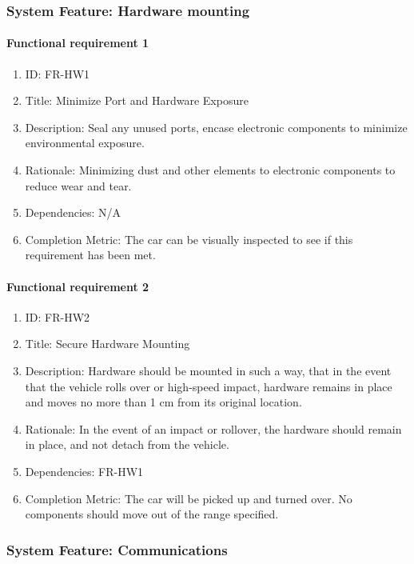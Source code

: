 \documentclass[compsoc,draftclsnofoot,onecolumn,10pt]{IEEEtran}
\begin{document}
\subsubsection{System Feature: Hardware mounting}
	\paragraph{Functional requirement 1}
		\begin{enumerate}
			\item ID: FR-HW1
			\item Title: Minimize Port and Hardware Exposure
			\item Description: Seal any unused ports, encase electronic components to minimize environmental exposure.
			\item Rationale: Minimizing dust and other elements to electronic components to reduce wear and tear.
			\item Dependencies: N/A
			\item Completion Metric: The car can be visually inspected to see if this requirement has been met. 
		\end{enumerate}

	\paragraph{ Functional requirement 2}
		\begin{enumerate}
			\item ID: FR-HW2
			\item Title: Secure Hardware Mounting
			\item Description: Hardware should be mounted in such a way, that in the event that the vehicle rolls over or high-speed impact, hardware remains in place and moves no more than 1 cm from its original location.
			\item Rationale: In the event of an impact or rollover, the hardware should remain in place, and not detach from the vehicle.
			\item Dependencies: FR-HW1
			\item Completion Metric: The car will be picked up and turned over. No components should move out of the range specified. 
		\end{enumerate}



\subsubsection{System Feature: Communications}
\end{document}

